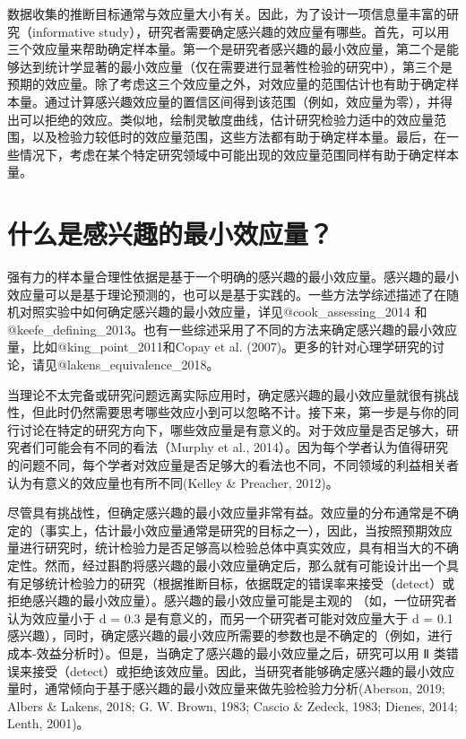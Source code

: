 \documentclass[
  letterpaper,
  DIV=11,
  numbers=noendperiod]{scrreprt}
\begin{document}
数据收集的推断目标通常与效应量大小有关。因此，为了设计一项信息量丰富的研究（informative
study），研究者需要确定感兴趣的效应量有哪些。首先，可以用三个效应量来帮助确定样本量。第一个是研究者感兴趣的最小效应量，第二个是能够达到统计学显著的最小效应量（仅在需要进行显著性检验的研究中），第三个是预期的效应量。除了考虑这三个效应量之外，对效应量的范围估计也有助于确定样本量。通过计算感兴趣效应量的置信区间得到该范围（例如，效应量为零），并得出可以拒绝的效应。类似地，绘制灵敏度曲线，估计研究检验力适中的效应量范围，以及检验力较低时的效应量范围，这些方法都有助于确定样本量。最后，在一些情况下，考虑在某个特定研究领域中可能出现的效应量范围同样有助于确定样本量。

\hypertarget{ux4ec0ux4e48ux662fux611fux5174ux8da3ux7684ux6700ux5c0fux6548ux5e94ux91cf}{%
\section{什么是感兴趣的最小效应量？}\label{ux4ec0ux4e48ux662fux611fux5174ux8da3ux7684ux6700ux5c0fux6548ux5e94ux91cf}}

强有力的样本量合理性依据是基于一个明确的感兴趣的最小效应量。感兴趣的最小效应量可以是基于理论预测的，也可以是基于实践的。一些方法学综述描述了在随机对照实验中如何确定感兴趣的最小效应量，详见@cook\_assessing\_2014
和@keefe\_defining\_2013。也有一些综述采用了不同的方法来确定感兴趣的最小效应量，比如@king\_point\_2011和Copay
et al.
(2007)。更多的针对心理学研究的讨论，请见@lakens\_equivalence\_2018。

当理论不太完备或研究问题远离实际应用时，确定感兴趣的最小效应量就很有挑战性，但此时仍然需要思考哪些效应小到可以忽略不计。接下来，第一步是与你的同行讨论在特定的研究方向下，哪些效应量是有意义的。对于效应量是否足够大，研究者们可能会有不同的看法（Murphy
et al.,
2014）。因为每个学者认为值得研究的问题不同，每个学者对效应量是否足够大的看法也不同，不同领域的利益相关者认为有意义的效应量也有所不同(Kelley
\& Preacher, 2012)。

尽管具有挑战性，但确定感兴趣的最小效应量非常有益。效应量的分布通常是不确定的（事实上，估计最小效应量通常是研究的目标之一），因此，当按照预期效应量进行研究时，统计检验力是否足够高以检验总体中真实效应，具有相当大的不确定性。然而，经过斟酌将感兴趣的最小效应量确定后，那么就有可能设计出一个具有足够统计检验力的研究（根据推断目标，依据既定的错误率来接受（detect）或拒绝感兴趣的最小效应量）。感兴趣的最小效应量可能是主观的
（如，一位研究者认为效应量小于 d = 0.3
是有意义的，而另一个研究者可能对效应量大于 d = 0.1
感兴趣），同时，确定感兴趣的最小效应所需要的参数也是不确定的（例如，进行成本-效益分析时）。但是，当确定了感兴趣的最小效应量之后，研究可以用
Ⅱ
类错误来接受（detect）或拒绝该效应量。因此，当研究者能够确定感兴趣的最小效应量时，通常倾向于基于感兴趣的最小效应量来做先验检验力分析(Aberson,
2019; Albers \& Lakens, 2018; G. W. Brown, 1983; Cascio \& Zedeck, 1983;
Dienes, 2014; Lenth, 2001)。
\end{document}
